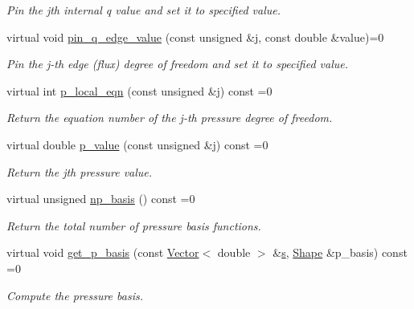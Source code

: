 \begin{DoxyCompactItemize}
\begin{DoxyCompactList}\small\item\em Pin the jth internal q value and set it to specified value. \end{DoxyCompactList}\item 
virtual void \hyperlink{classoomph_1_1AxisymmetricPoroelasticityEquations_acf1c7d9fce77306a33838bfc55d899a3}{pin\+\_\+q\+\_\+edge\+\_\+value} (const unsigned \&j, const double \&value)=0
\begin{DoxyCompactList}\small\item\em Pin the j-\/th edge (flux) degree of freedom and set it to specified value. \end{DoxyCompactList}\item 
virtual int \hyperlink{classoomph_1_1AxisymmetricPoroelasticityEquations_afb2d0c38f776d9182d2cf93b37206023}{p\+\_\+local\+\_\+eqn} (const unsigned \&j) const =0
\begin{DoxyCompactList}\small\item\em Return the equation number of the j-\/th pressure degree of freedom. \end{DoxyCompactList}\item 
virtual double \hyperlink{classoomph_1_1AxisymmetricPoroelasticityEquations_aab0aa10f1a243bff20e540a3744c1c5b}{p\+\_\+value} (const unsigned \&j) const =0
\begin{DoxyCompactList}\small\item\em Return the jth pressure value. \end{DoxyCompactList}\item 
virtual unsigned \hyperlink{classoomph_1_1AxisymmetricPoroelasticityEquations_a8a17486deaa1115a98608e76344aa67c}{np\+\_\+basis} () const =0
\begin{DoxyCompactList}\small\item\em Return the total number of pressure basis functions. \end{DoxyCompactList}\item 
virtual void \hyperlink{classoomph_1_1AxisymmetricPoroelasticityEquations_ae3a7d5fd68eb6c68770d7783013bda19}{get\+\_\+p\+\_\+basis} (const \hyperlink{classoomph_1_1Vector}{Vector}$<$ double $>$ \&\hyperlink{cfortran_8h_ab7123126e4885ef647dd9c6e3807a21c}{s}, \hyperlink{classoomph_1_1Shape}{Shape} \&p\+\_\+basis) const =0
\begin{DoxyCompactList}\small\item\em Compute the pressure basis. \end{DoxyCompactList}\item 

\end{DoxyCompactItemize}
